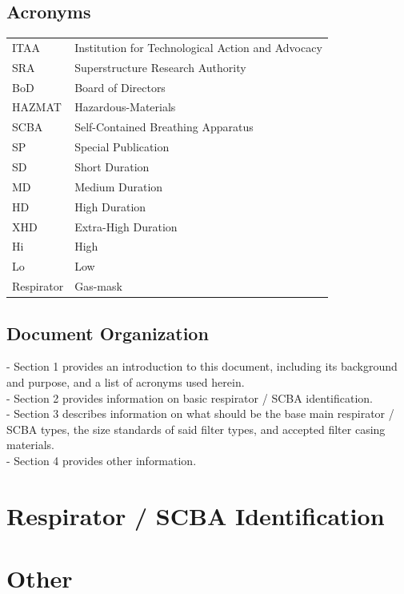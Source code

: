 \documentclass[a4paper, 12pt, oneside]{article}
\begin{document}
{			\subsection{Acronyms}
			\begin{tabular}{|p{2cm} p{10cm}}
				ITAA & Institution for Technological Action and Advocacy \\
				SRA & Superstructure Research Authority \\
				BoD & Board of Directors \\
				HAZMAT & Hazardous-Materials \\
				SCBA & Self-Contained Breathing Apparatus \\
				SP & Special Publication \\
				SD & Short Duration \\
				MD & Medium Duration \\
				HD & High Duration \\
				XHD & Extra-High Duration \\
				Hi & High \\
				Lo & Low \\
				Respirator & Gas-mask \\
			\end{tabular}
			\subsection{Document Organization}
				- Section 1 provides an introduction to this document, including its background and purpose, and a list of acronyms used herein. \\
				- Section 2 provides information on basic respirator / SCBA identification. \\
				- Section 3 describes information on what should be the base main respirator / SCBA types, the size standards of said filter types, and accepted filter casing materials. \\
				- Section 4 provides other information.
				
		\newpage
				
		\section{Respirator / SCBA Identification}
		
		\newpage
		
		\section{Other}\-\\
}
\end{document}
